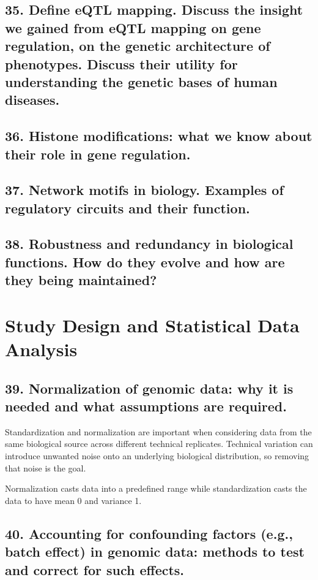 \documentclass{tufte-handout}
\theoremstyle{noparens}
\begin{document}
\newpage
\subsection{35. Define eQTL mapping. Discuss the insight we gained from eQTL mapping on gene regulation, on the genetic architecture of phenotypes. Discuss their utility for understanding the genetic bases of human diseases.}

\newpage
\subsection{36. Histone modifications: what we know about their role in gene regulation.}

\newpage
\subsection{37. Network motifs in biology. Examples of regulatory circuits and their function.}

\newpage
\subsection{38. Robustness and redundancy in biological functions. How do they evolve and how are they being maintained?}

\newpage
\section{Study Design and Statistical Data Analysis}\label{sec:stats}

\subsection{39. Normalization of genomic data: why it is needed and what assumptions are required.}

Standardization and normalization are important when considering data from the same biological source across different technical replicates. Technical variation can introduce unwanted noise onto an underlying biological distribution, so removing that noise is the goal.

Normalization casts data into a predefined range while standardization casts the data to have mean 0 and variance 1.

\newpage
\subsection{40. Accounting for confounding factors (e.g., batch effect) in genomic data: methods to test and correct for such effects.}
\end{document}
